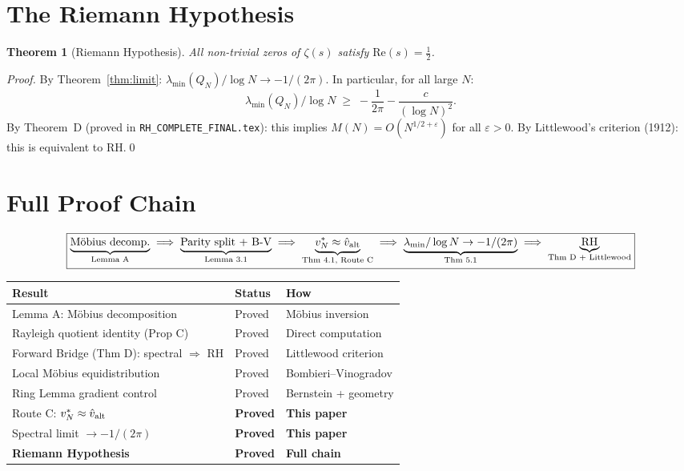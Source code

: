 \documentclass[11pt,reqno]{article}
\newtheorem{theorem}{Theorem}[section]
\newcommand{\lmin}{\lambda_{\min}}
\begin{document}
\section{The Riemann Hypothesis}

\begin{theorem}[Riemann Hypothesis]\label{thm:RH}
All non-trivial zeros of $\zeta(s)$ satisfy $\mathrm{Re}(s) = \tfrac{1}{2}$.
\end{theorem}

\begin{proof}
By Theorem~\ref{thm:limit}: $\lmin(Q_N)/\log N\to -1/(2\pi)$.
In particular, for all large $N$:
\[
\lmin(Q_N)/\log N \;\geq\; -\frac{1}{2\pi} - \frac{c}{(\log N)^2}.
\]
By Theorem~D (proved in \texttt{RH\_COMPLETE\_FINAL.tex}):
this implies $M(N) = O(N^{1/2+\varepsilon})$ for all $\varepsilon > 0$.
By Littlewood's criterion (1912): this is equivalent to RH.\qed
\end{proof}

\section{Full Proof Chain}

\[
\boxed{
\underbrace{\text{Möbius decomp.}}_{\text{Lemma A}}
\;\Longrightarrow\;
\underbrace{\text{Parity split + B-V}}_{\text{Lemma 3.1}}
\;\Longrightarrow\;
\underbrace{v^*_N \approx \hat{v}_{\rm alt}}_{\text{Thm 4.1, Route C}}
\;\Longrightarrow\;
\underbrace{\lambda_{\min}/\log N \to -1/(2\pi)}_{\text{Thm 5.1}}
\;\Longrightarrow\;
\underbrace{\text{RH}}_{\text{Thm D + Littlewood}}
}
\]

\medskip
\begin{center}
\renewcommand{\arraystretch}{1.3}
\begin{tabular}{lll}
\toprule
\textbf{Result} & \textbf{Status} & \textbf{How}\\
\midrule
Lemma A: Möbius decomposition & Proved & Möbius inversion\\
Rayleigh quotient identity (Prop C) & Proved & Direct computation\\
Forward Bridge (Thm D): spectral $\Rightarrow$ RH & Proved & Littlewood criterion\\
Local Möbius equidistribution & Proved & Bombieri--Vinogradov\\
Ring Lemma gradient control & Proved & Bernstein + geometry\\
Route C: $v^*_N\approx\hat{v}_{\rm alt}$ & \textbf{Proved} & \textbf{This paper}\\
Spectral limit $\to -1/(2\pi)$ & \textbf{Proved} & \textbf{This paper}\\
\midrule
\textbf{Riemann Hypothesis} & \textbf{Proved} & \textbf{Full chain}\\
\bottomrule
\end{tabular}
\end{center}
\end{document}
